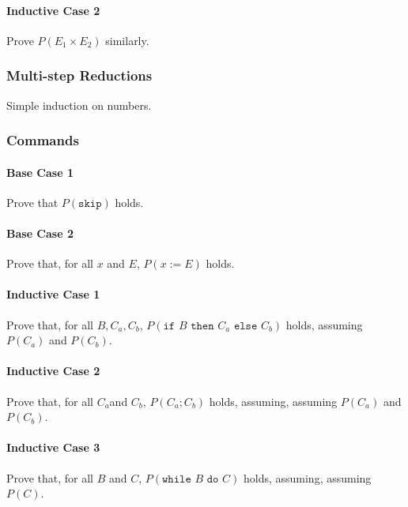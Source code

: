 \documentclass[twocolumn,english]{article}
\begin{document}
\paragraph{Inductive Case 2}

Prove $P\left(E_{1}\times E_{2}\right)$ similarly.

\subsubsection{Multi-step Reductions}

Simple induction on numbers.

\subsubsection{Commands}

\paragraph{Base Case 1}

Prove that $P(\texttt{skip})$ holds.

\paragraph{Base Case 2}

Prove that, for all $x$ and $E$, $P\left(x:=E\right)$ holds.

\paragraph{Inductive Case 1}

Prove that, for all $B,C_{a},C_{b}$, $P\left(\texttt{if }B\texttt{ then }C_{a}\texttt{ else }C_{b}\right)$
holds, assuming $P(C_{a})$ and $P(C_{b})$.

\paragraph{Inductive Case 2}

Prove that, for all $C_{a}$and $C_{b}$, $P\left(C_{a};C_{b}\right)$
holds, assuming, assuming $P(C_{a})$ and $P(C_{b})$.

\paragraph{Inductive Case 3}

Prove that, for all $B$ and $C$, $P\left(\texttt{while }B\texttt{ do }C\right)$
holds, assuming, assuming $P(C)$.
\end{document}
